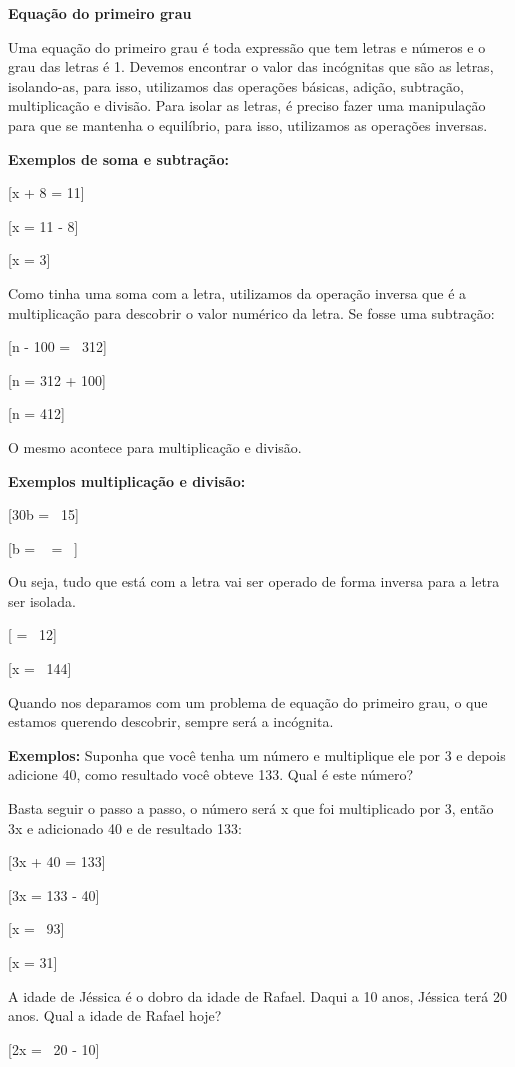 \textbf{Equação do primeiro grau}

Uma equação do primeiro grau é toda expressão que tem letras e números e
o grau das letras é 1. Devemos encontrar o valor das incógnitas que são
as letras, isolando-as, para isso, utilizamos das operações básicas,
adição, subtração, multiplicação e divisão. Para isolar as letras, é
preciso fazer uma manipulação para que se mantenha o equilíbrio, para
isso, utilizamos as operações inversas.

\textbf{Exemplos de soma e subtração:}

[x + 8 = 11]

[x = 11 - 8]

[x = 3]

Como tinha uma soma com a letra, utilizamos da operação inversa que é a
multiplicação para descobrir o valor numérico da letra. Se fosse uma
subtração:

[n - 100 = \ 312]

[n = 312 + 100]

[n = 412]

O mesmo acontece para multiplicação e divisão.

\textbf{Exemplos multiplicação e divisão:}

[30b = \ 15]

[b = \  = \ ]

Ou seja, tudo que está com a letra vai ser operado de forma inversa para
a letra ser isolada.

[ = \ 12]

[x = \ 144]

Quando nos deparamos com um problema de equação do primeiro grau, o que
estamos querendo descobrir, sempre será a incógnita.

\textbf{Exemplos:} Suponha que você tenha um número e multiplique ele
por 3 e depois adicione 40, como resultado você obteve 133. Qual é este
número?

Basta seguir o passo a passo, o número será x que foi multiplicado por
3, então 3x e adicionado 40 e de resultado 133:

[3x + 40 = 133]

[3x = 133 - 40]

[x = \ 93]

[x = 31]

A idade de Jéssica é o dobro da idade de Rafael. Daqui a 10 anos,
Jéssica terá 20 anos. Qual a idade de Rafael hoje?

[2x = \ 20 - 10]

